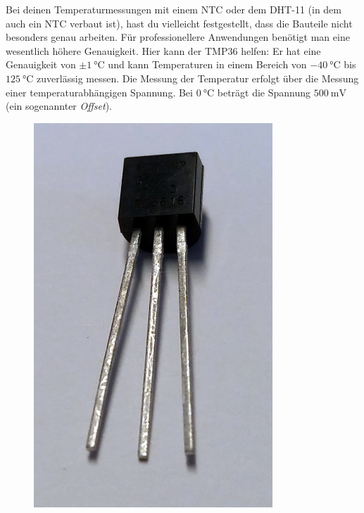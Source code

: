 \begin{minipage}{0.58\textwidth}
	Bei deinen Temperaturmessungen mit einem NTC oder dem DHT-11 (in dem auch ein NTC verbaut ist), hast du vielleicht festgestellt, dass die Bauteile nicht besonders genau arbeiten. Für professionellere Anwendungen benötigt man eine wesentlich höhere Genauigkeit. Hier kann der TMP36 helfen: Er hat eine Genauigkeit von $\pm \SI{1}{\celsius}$ und kann Temperaturen in einem Bereich von $\SI{-40}{\celsius}$ bis $\SI{125}{\celsius}$ zuverlässig messen. Die Messung der Temperatur erfolgt über die Messung einer temperaturabhängigen Spannung. Bei $\SI{0}{\celsius}$ beträgt die Spannung $\SI{500}{\milli\volt}$ (ein sogenannter \emph{Offset}).
\end{minipage}
\hfill
\begin{minipage}{0.4\textwidth}
	\begin{figure}[H]
		\begin{minipage}{0.48\textwidth}
			\centering
			\includegraphics[width=0.8\textwidth]{./pics/tmp36.jpg}
		\end{minipage}

\end{figure}
\end{minipage}

